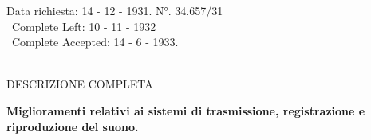 \documentclass[11pt]{article}
\begin{document}
\begin{minipage}{0.9\linewidth}
\vspace{0.3cm}
\begin{center}

Data richiesta: 14 - 12 - 1931. N°. 34.657/31\\\
Complete Left: 10 - 11 - 1932\\\
Complete Accepted: 14 - 6 - 1933.\\\

DESCRIZIONE COMPLETA

\end{center}

\end{minipage}

\vspace{1cm}

\begin{minipage}{0.95\linewidth}
\begin{center}
{\Large{\textbf{\textsf{Miglioramenti relativi ai sistemi di trasmissione, registrazione e riproduzione del suono.}}}} \\

\end{center}
\end{minipage}
\vspace*{0.8cm}


\end{document}
